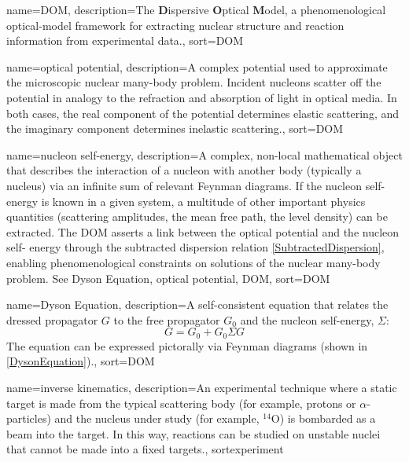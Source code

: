 
\makeglossaries

{
    name={DOM},
    description={The \textbf{D}ispersive \textbf{O}ptical \textbf{M}odel, a phenomenological optical-model framework for extracting nuclear structure and reaction information from experimental data.},
    sort={DOM}
}

{
    name={optical potential},
    description={A complex potential used to approximate the microscopic nuclear many-body problem. Incident nucleons scatter off the potential in analogy to the refraction and absorption of light in optical media.  In both cases, the real component of the potential determines elastic scattering, and the imaginary component determines inelastic scattering.},
    sort={DOM}
}

{
    name={nucleon self-energy},
    description={A complex, non-local mathematical object that describes the interaction of a
        nucleon with another body (typically a nucleus) via an infinite sum of relevant Feynman 
        diagrams. If the nucleon self-energy is known in a given system, a multitude of other 
        important physics quantities (scattering amplitudes, the mean free path, the level density) 
        can be extracted. The DOM asserts a link between the optical potential and the nucleon self-
        energy through the subtracted dispersion relation \ref{SubtractedDispersion}, enabling 
        phenomenological constraints on solutions of the nuclear many-body 
        problem. See \Gls{Dyson Equation}, \Gls{optical potential}, \Gls{DOM}},
    sort={DOM}
}

{
    name={Dyson Equation},
    description={A self-consistent equation that relates the dressed propagator $G$ to the free
        propagator $G_{0}$ and the \Gls{nucleon self-energy}, $\Sigma$:
        \begin{equation}
            G = G_{0} + G_{0} \Sigma G
        \end{equation}
        The equation can be expressed pictorally via Feynman diagrams (shown in
        \ref{DysonEquation}).},
    sort={DOM}
}

{
    name={inverse kinematics},
    description={An experimental technique where a static target is made from the typical scattering body
        (for example, protons or $\alpha$-particles) and the nucleus under study (for
        example, $^{14}$O) is bombarded as a beam into the target. In this way, reactions can be
        studied on unstable nuclei that cannot be made into a fixed targets.},
    sort{experiment}
}
